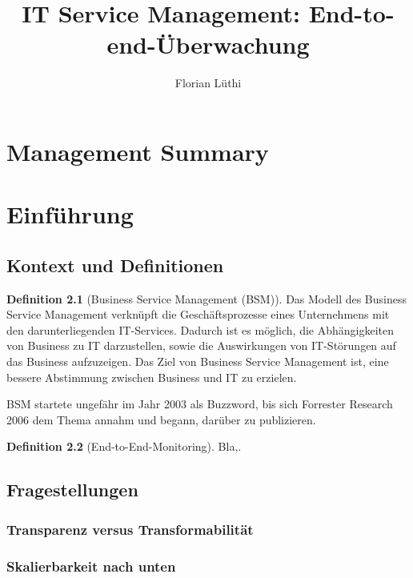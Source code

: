 \documentclass[11pt,listof=totoc]{scrreprt} %
\title{IT Service Management: End-to-end-Überwachung}
\author{Florian Lüthi}
\theoremstyle{definition}
\newtheorem{definition}{Definition}
\begin{document}
\maketitle

\tableofcontents

\chapter{Management Summary}

\chapter{Einführung}

\section{Kontext und Definitionen}

\begin{definition}[Business Service Management (BSM)]
Das Modell des Business Service Management verknüpft die Geschäftsprozesse eines Unternehmens mit den darunterliegenden IT-Services. Dadurch ist es möglich, die Abhängigkeiten von Business zu IT darzustellen, sowie die Auswirkungen von IT-Störungen auf das Business aufzuzeigen. Das Ziel von Business Service Management ist, eine bessere Abstimmung zwischen Business und IT zu erzielen. \cite{wiki:bsm}
\end{definition}

BSM startete ungefähr im Jahr 2003 als Buzzword, bis sich Forrester Research 2006 dem Thema annahm und begann, darüber zu publizieren. \cite{wiki:bsm, forrester:bsm, forrester:implementingBsm}

\begin{definition}[End-to-End-Monitoring]
Bla,.
\end{definition}

\section{Fragestellungen}

\subsection{Transparenz versus Transformabilität}

\subsection{Skalierbarkeit nach unten}
\end{document}
